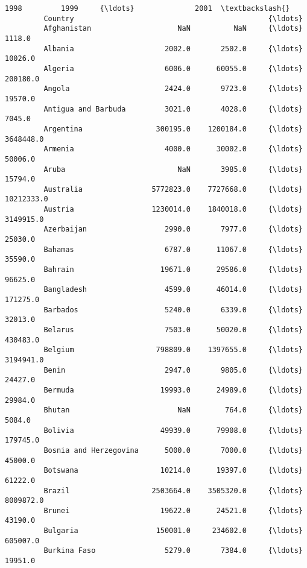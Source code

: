 \documentclass[11pt]{article}
\begin{document}
\begin{Verbatim}[commandchars=\\\{\}]
                                       1998         1999     {\ldots}              2001  \textbackslash{}
         Country                                             {\ldots}                     
         Afghanistan                    NaN          NaN     {\ldots}            1118.0   
         Albania                     2002.0       2502.0     {\ldots}           10026.0   
         Algeria                     6006.0      60055.0     {\ldots}          200180.0   
         Angola                      2424.0       9723.0     {\ldots}           19570.0   
         Antigua and Barbuda         3021.0       4028.0     {\ldots}            7045.0   
         Argentina                 300195.0    1200184.0     {\ldots}         3648448.0   
         Armenia                     4000.0      30002.0     {\ldots}           50006.0   
         Aruba                          NaN       3985.0     {\ldots}           15794.0   
         Australia                5772823.0    7727668.0     {\ldots}        10212333.0   
         Austria                  1230014.0    1840018.0     {\ldots}         3149915.0   
         Azerbaijan                  2990.0       7977.0     {\ldots}           25030.0   
         Bahamas                     6787.0      11067.0     {\ldots}           35590.0   
         Bahrain                    19671.0      29586.0     {\ldots}           96625.0   
         Bangladesh                  4599.0      46014.0     {\ldots}          171275.0   
         Barbados                    5240.0       6339.0     {\ldots}           32013.0   
         Belarus                     7503.0      50020.0     {\ldots}          430483.0   
         Belgium                   798809.0    1397655.0     {\ldots}         3194941.0   
         Benin                       2947.0       9805.0     {\ldots}           24427.0   
         Bermuda                    19993.0      24989.0     {\ldots}           29984.0   
         Bhutan                         NaN        764.0     {\ldots}            5084.0   
         Bolivia                    49939.0      79908.0     {\ldots}          179745.0   
         Bosnia and Herzegovina      5000.0       7000.0     {\ldots}           45000.0   
         Botswana                   10214.0      19397.0     {\ldots}           61222.0   
         Brazil                   2503664.0    3505320.0     {\ldots}         8009872.0   
         Brunei                     19622.0      24521.0     {\ldots}           43190.0   
         Bulgaria                  150001.0     234602.0     {\ldots}          605007.0   
         Burkina Faso                5279.0       7384.0     {\ldots}           19951.0   

\end{Verbatim}
\end{document}
